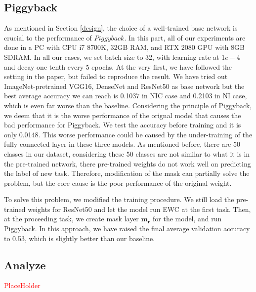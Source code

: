 \subsection{Piggyback}
As mentioned in Section \ref{design}, the choice of a well-trained base network is crucial to the performance of $Piggyback$. In this part, all of our experiments are done in a PC with CPU i7 8700K, 32GB RAM, and RTX 2080 GPU with 8GB SDRAM. In all our cases, we set batch size to 32, with learning rate at $1e-4$ and decay one tenth every 5 epochs. At the very first, we have followed the setting in the paper, but failed to reproduce the result. We have tried out ImageNet-pretrained VGG16\cite{simonyan2014very}, DenseNet\cite{huang2017densely} and ResNet50 as base network but the best average accuracy we can reach is 0.1037 in NIC case and 0.2103 in NI case, which is even far worse than the baseline. Considering the principle of Piggyback, we deem that it is the worse performance of the orignal model that causes the bad performance for Piggyback. We test the accuracy before training and it is only 0.0148. This worse performance could be caused by the under-training of the fully connected layer in these three models. As mentioned before, there are 50 classes in our dataset, considering these 50 classes are not similar to what it is in the pre-trained network, there pre-trained weights do not work well on predicting the label of new task. Therefore, modification of the mask can partially solve the problem, but the core cause is the poor performance of the original weight.

To solve this problem, we modified the training procedure. We still load the pre-trained weights for ResNet50 and let the model run EWC at the first task. Then, at the proceeding task, we create mask layer $\mathbf{m_r}$ for the model, and run Piggyback. In this approach, we have raised the final average validation accuracy to 0.53, which is slightly better than our baseline. 

\subsection{Analyze}
\textcolor{red}{PlaceHolder}
